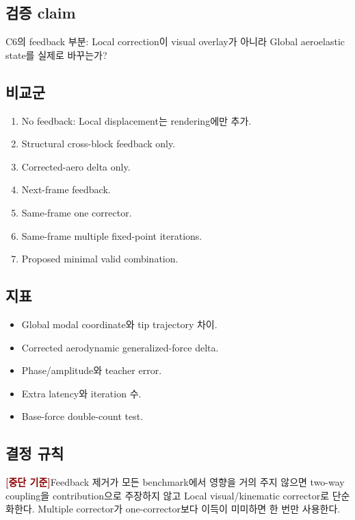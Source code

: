 \documentclass[11pt,a4paper]{article}
\newcommand{\killgate}{\textcolor{darkred}{\textbf{[중단 기준]}}}
\begin{document}
\subsection*{검증 claim}

C6의 feedback 부분:
Local correction이 visual overlay가 아니라 Global aeroelastic state를 실제로 바꾸는가?

\subsection*{비교군}

\begin{enumerate}[leftmargin=1.7em]
  \item No feedback: Local displacement는 rendering에만 추가.
  \item Structural cross-block feedback only.
  \item Corrected-aero delta only.
  \item Next-frame feedback.
  \item Same-frame one corrector.
  \item Same-frame multiple fixed-point iterations.
  \item Proposed minimal valid combination.
\end{enumerate}

\subsection*{지표}

\begin{itemize}[leftmargin=1.5em]
  \item Global modal coordinate와 tip trajectory 차이.
  \item Corrected aerodynamic generalized-force delta.
  \item Phase/amplitude와 teacher error.
  \item Extra latency와 iteration 수.
  \item Base-force double-count test.
\end{itemize}

\subsection*{결정 규칙}

\killgate Feedback 제거가 모든 benchmark에서 영향을 거의 주지 않으면
two-way coupling을 contribution으로 주장하지 않고
Local visual/kinematic corrector로 단순화한다.
Multiple corrector가 one-corrector보다 이득이 미미하면 한 번만 사용한다.
\end{document}
